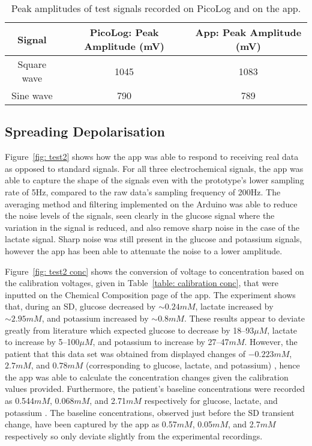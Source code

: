 \begin{table}[h!]
\centering
\begin{tabular}{||c c c||} 
 \hline
 Signal & PicoLog: Peak Amplitude (mV) & App: Peak Amplitude (mV) \\ [0.5ex] 
 \hline\hline
 Square wave & 1045 & 1083 \\
 Sine wave & 790 & 789 \\
 \hline
\end{tabular}
\caption{Peak amplitudes of test signals recorded on PicoLog and on the app.}
\label{table: peak amplitudes}
\end{table}


\subsection{Spreading Depolarisation}

Figure~\ref{fig: test2} shows how the app was able to respond to receiving real data as opposed to standard signals. For all three electrochemical signals, the app was able to capture the shape of the signals even with the prototype's lower sampling rate of 5Hz, compared to the raw data's sampling frequency of 200Hz. The averaging method and filtering implemented on the Arduino was able to reduce the noise levels of the signals, seen clearly in the glucose signal where the variation in the signal is reduced, and also remove sharp noise in the case of the lactate signal. Sharp noise was still present in the glucose and potassium signals, however the app has been able to attenuate the noise to a lower amplitude.

Figure~\ref{fig: test2 conc} shows the conversion of voltage to concentration based on the calibration voltages, given in Table~\ref{table: calibration conc}, that were inputted on the Chemical Composition page of the app. The experiment shows that, during an SD, glucose decreased by $\sim0.24 mM$, lactate increased by $\sim2.95 mM$, and potassium increased by $\sim0.8 mM$. These results appear to deviate greatly from literature which expected glucose to decrease by 18--93$\mu M$, lactate to increase by 5--100$\mu M$, and potassium to increase by 27--47$mM$. However, the patient that this data set was obtained from displayed changes of $-0.223mM$, $2.7mM$, and $0.78mM$ (corresponding to glucose, lactate, and potassium) \cite{Rogers2017}, hence the app was able to calculate the concentration changes given the calibration values provided. Furthermore, the patient's baseline concentrations were recorded as 0.544$mM$, 0.068$mM$, and 2.71$mM$ respectively for glucose, lactate, and potassium \cite{Rogers2017}. The baseline concentrations, observed just before the SD transient change, have been captured by the app as 0.57$mM$, 0.05$mM$, and 2.7$mM$ respectively so only deviate slightly from the experimental recordings.



